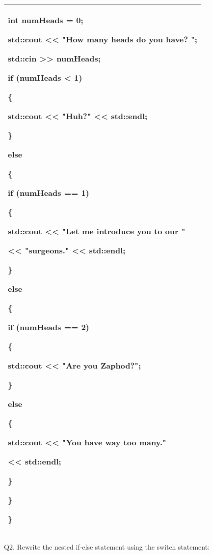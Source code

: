 \documentclass[
]{article}
\begin{document}
\begin{longtable}[]{@{}l@{}}
\toprule
\endhead
\begin{minipage}[t]{0.97\columnwidth}\raggedright
int numHeads = 0;

std::cout \textless\textless{} "How many heads do you have? ";

std::cin \textgreater\textgreater{} numHeads;

if (numHeads \textless{} 1)

\{

std::cout \textless\textless{} "Huh?" \textless\textless{} std::endl;

\}

else

\{

if (numHeads == 1)

\{

std::cout \textless\textless{} "Let me introduce you to our "

\textless\textless{} "surgeons." \textless\textless{} std::endl;

\}

else

\{

if (numHeads == 2)

\{

std::cout \textless\textless{} "Are you Zaphod?";

\}

else

\{

std::cout \textless\textless{} "You have way too many."

\textless\textless{} std::endl;

\}

\}

\}\strut
\end{minipage}\tabularnewline
\bottomrule
\end{longtable}

Q2. Rewrite the nested if-else statement using the switch statement:
\end{document}
